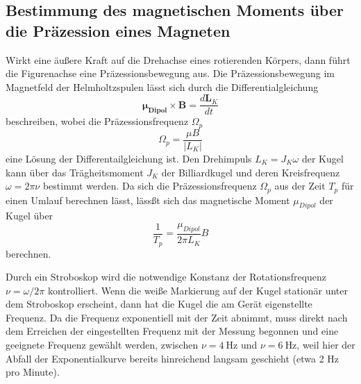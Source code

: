 \subsection{Bestimmung des magnetischen Moments über die Präzession eines Magneten}
\label{sec:Präzession}
Wirkt eine äußere Kraft auf die Drehachse eines rotierenden Körpers, dann führt die Figurenachse eine Präzessionsbewegung aus.
Die Präzessionsbewegung im Magnetfeld der Helmholtzspulen lässt sich durch die Differentialgleichung
\begin{equation}
    \symbf{\mu_{Dipol}} \times \symbf{B} = \frac{d\symbf{L}_K}{dt}
\end{equation}
beschreiben, wobei die Präzessionsfrequenz $\Omega_p$
\begin{equation}
    \Omega_p = \frac{\mu B}{|L_K|}
\end{equation}
eine Lösung der Differentailgleichung ist.
Den Drehimpuls $L_K = J_K \omega$ der Kugel kann über das Trägheitsmoment $J_K$ der Billiardkugel und deren Kreisfrequenz $\omega = 2\pi \nu$ bestimmt werden.
Da sich die Präzessionsfrequenz $\Omega_p$ aus der Zeit $T_p$ für einen Umlauf berechnen lässt, lässßt sich das magnetische Moment $\mu_{Dipol}$ der Kugel über
\begin{equation}
    \frac{1}{T_p} = \frac{\mu_{Dipol}}{2 \pi L_K} B
\end{equation}
berechnen.

Durch ein Stroboskop wird die notwendige Konstanz der Rotationsfrequenz $\nu = \omega / 2 \pi$ kontrolliert.
Wenn die weiße Markierung auf der Kugel stationär unter dem Stroboskop erscheint, dann hat die Kugel die am Gerät eigenstellte Frequenz.
Da die Frequenz exponentiell mit der Zeit abnimmt, muss direkt nach dem Erreichen der eingestellten Frequenz mit der Messung begonnen und
eine geeignete Frequenz gewählt werden, zwischen $\nu = \SI{4}{\Hz}$ und $\nu = \SI{6}{\Hz}$, weil hier der Abfall der Exponentialkurve bereits hinreichend langsam geschieht (etwa 2 Hz pro Minute).
